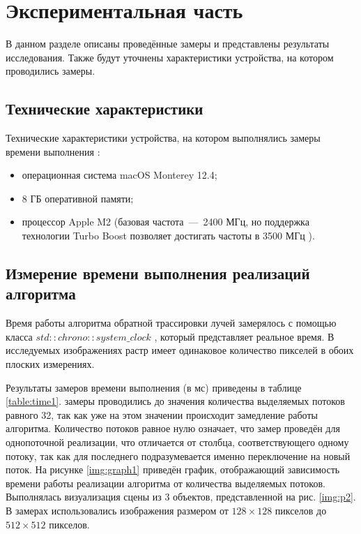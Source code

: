 \chapter{Экспериментальная часть}

В данном разделе описаны проведённые замеры и представлены результаты исследования. Также будут уточнены характеристики устройства, на котором проводились замеры.

\section{Технические характеристики}
Технические характеристики устройства, на котором выполнялись замеры времени выполнения \cite{web_item5}:
\begin{itemize}
	\item операционная система macOS Monterey 12.4;
	\item 8 ГБ оперативной памяти;
	\item процессор Apple M2 (базовая частота~---~2400 МГц, но поддержка технологии Turbo Boost позволяет достигать частоты в 3500 МГц \cite{web_item10}).
\end{itemize}

\section{Измерение времени выполнения реализаций алгоритма}
Время работы алгоритма обратной трассировки лучей замерялось с помощью класса $std::chrono::system\_clock$ \cite{web_item11}, который представляет реальное время. В исследуемых изображениях растр имеет одинаковое количество пикселей в обоих плоских измерениях.

Результаты замеров времени выполнения (в мс) приведены в таблице \ref{table:time1}. замеры проводились до значения количества выделяемых потоков равного 32, так как уже на этом значении происходит замедление работы алгоритма. Количество потоков равное нулю означает, что замер проведён для однопоточной реализации, что отличается от столбца, соответствующего одному потоку, так как для последнего подразумевается именно переключение на новый поток. На рисунке \ref{img:graph1} приведён график, отображающий зависимость времени работы реализации алгоритма от количества выделяемых потоков. Выполнялась визуализация сцены из 3 объектов, представленной на рис. \ref{img:p2}. В замерах использовались изображения размером от $128 \times 128$ пикселов до $512 \times 512$ пикселов.

